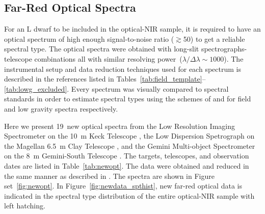 \documentclass[12pt,preprint]{aastex}
\newcommand{\newopt}{19} %
\begin{document}
\subsection{Far-Red Optical Spectra}

For an L dwarf to be included in the optical-NIR sample, it is required to have an optical spectrum of high enough signal-to-noise ratio ($\gtrsim$50) to get a reliable spectral type.
The optical spectra were obtained with long-slit spectrographs-telescope combinations all with similar resolving power~($\lambda/\Delta\lambda\sim1000$). 
The instrumental setup and data reduction techniques used for each spectrum is described in the references listed in Tables~\ref{tab:field_template}--\ref{tab:lowg_excluded}.
Every spectrum was visually compared to spectral standards in order to estimate spectral types using the schemes of \citet{K99} and \cite{Cruz09_lowg} for field and low gravity spectra respectively.  



\label{sec:obs_new_opt}

Here we present \newopt~new optical spectra from the Low Resolution Imaging Spectrometer on the 10~m Keck Telescope \citep[LRIS]{LRIS}, the Low Dispersion Spetrograph on the Magellan 6.5~m Clay Telescope \citep[LDSS-3]{LDSS2}, and the Gemini Multi-object Spectrometer on the 8~m Gemini-South Telescope \citep[GMOS]{GMOS}.
The targets, telescopes, and observation dates are listed in Table~\ref{tab:newopt}. 
The data were obtained and reduced in the same manner as described in \citet{Kirkpatrick10}. 
The spectra are shown in Figure set~\ref{fig:newopt}.
In Figure~\ref{fig:newdata_spthist}, new far-red optical data is indicated in the spectral type distribution of the entire optical-NIR sample with left hatching.
\end{document}
